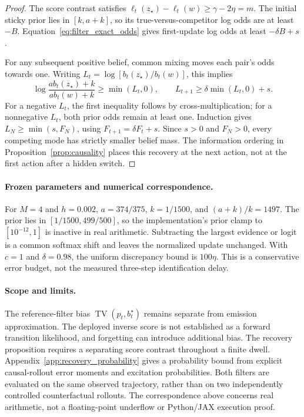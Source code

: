 \begin{proof}
The score contrast satisfies $\ell_t(z_\star)-\ell_t(w)\ge\gamma-2\eta=m$.
The initial sticky prior lies in $[k,a+k]$, so its true-versus-competitor log odds are at least $-B$.
Equation~\eqref{eq:filter_exact_odds} gives first-update log odds at least $-\delta B+s$.

For any subsequent positive belief, common mixing moves each pair's odds towards one.
Writing $L_t=\log[b_t(z_\star)/b_t(w)]$, this implies
\begin{equation}
 \log\frac{a b_t(z_\star)+k}{a b_t(w)+k}
 \ge\min(L_t,0),\qquad
 L_{t+1}\ge\delta\min(L_t,0)+s.
\end{equation}
For a negative $L_t$, the first inequality follows by cross-multiplication; for a nonnegative $L_t$, both prior odds remain at least one.
Induction gives $L_N\ge\min(s,F_N)$, using $F_{t+1}=\delta F_t+s$.
Since $s>0$ and $F_N>0$, every competing mode has strictly smaller belief mass.
The information ordering in Proposition~\ref{prop:causality} places this recovery at the next action, not at the first action after a hidden switch.
\end{proof}

\paragraph{Frozen parameters and numerical correspondence.}
For $M=4$ and $h=0.002$, $a=374/375$, $k=1/1500$, and $(a+k)/k=1497$.
The prior lies in $[1/1500,499/500]$, so the implementation's prior clamp to $[10^{-12},1]$ is inactive in real arithmetic.
Subtracting the largest evidence or logit is a common softmax shift and leaves the normalized update unchanged.
With $c=1$ and $\delta=0.98$, the uniform discrepancy bound is $100\eta$.
This is a conservative error budget, not the measured three-step identification delay.

\paragraph{Scope and limits.}
The reference-filter bias $\operatorname{TV}(p_t,b_t^\star)$ remains separate from emission approximation.
The deployed inverse score is not established as a forward transition likelihood, and forgetting can introduce additional bias.
The recovery proposition requires a separating score contrast throughout a finite dwell.
Appendix~\ref{app:recovery_probability} gives a probability bound from explicit causal-rollout error moments and excitation probabilities.
Both filters are evaluated on the same observed trajectory, rather than on two independently controlled counterfactual rollouts.
The correspondence above concerns real arithmetic, not a floating-point underflow or Python/JAX execution proof.

